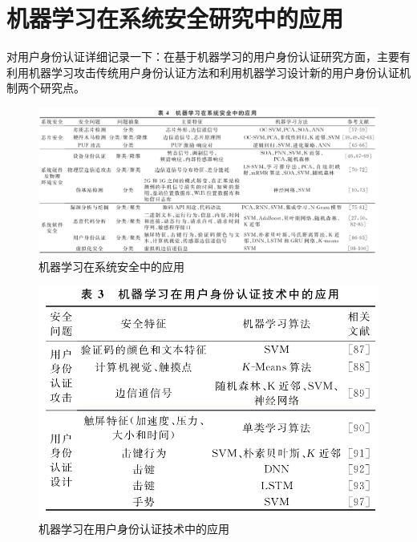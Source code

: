 \documentclass[UTF8]{ctexart}
\begin{document}
	\section{机器学习在系统安全研究中的应用}\label{sec:disanjie}
	对用户身份认证详细记录一下：在基于机器学习的用户身份认证研究方面，主要有利用机器学习攻击传统用户身份认证方法和利用机器学习设计新的用户身份认证机制两个研究点。
	\begin{figure}[ht]
        \centering
        \includegraphics[scale=0.5]{picture/005.png}
        \caption{机器学习在系统安全中的应用}
        \label{fig:005}
    \end{figure}
    \begin{figure}[ht]
        \centering
        \includegraphics[scale=0.5]{picture/006.png}
        \caption{机器学习在用户身份认证技术中的应用}
        \label{fig:006}
    \end{figure}
	\clearpage
\end{document}
